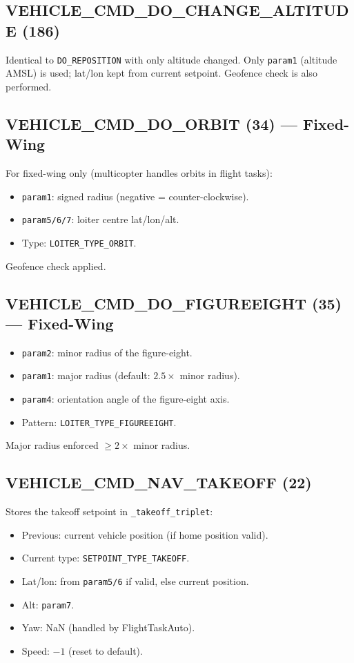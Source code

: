 \documentclass[12pt,a4paper]{article}
\begin{document}
\subsection{VEHICLE\_CMD\_DO\_CHANGE\_ALTITUDE (186)}

Identical to \texttt{DO\_REPOSITION} with only altitude changed.
Only \texttt{param1} (altitude AMSL) is used; lat/lon kept from current setpoint.
Geofence check is also performed.

\subsection{VEHICLE\_CMD\_DO\_ORBIT (34) --- Fixed-Wing}

For fixed-wing only (multicopter handles orbits in flight tasks):
\begin{itemize}
  \item \texttt{param1}: signed radius (negative = counter-clockwise).
  \item \texttt{param5/6/7}: loiter centre lat/lon/alt.
  \item Type: \texttt{LOITER\_TYPE\_ORBIT}.
\end{itemize}
Geofence check applied.

\subsection{VEHICLE\_CMD\_DO\_FIGUREEIGHT (35) --- Fixed-Wing}

\begin{itemize}
  \item \texttt{param2}: minor radius of the figure-eight.
  \item \texttt{param1}: major radius (default: $2.5 \times$ minor radius).
  \item \texttt{param4}: orientation angle of the figure-eight axis.
  \item Pattern: \texttt{LOITER\_TYPE\_FIGUREEIGHT}.
\end{itemize}
Major radius enforced $\geq 2 \times$ minor radius.

\subsection{VEHICLE\_CMD\_NAV\_TAKEOFF (22)}

Stores the takeoff setpoint in \texttt{\_takeoff\_triplet}:
\begin{itemize}
  \item Previous: current vehicle position (if home position valid).
  \item Current type: \texttt{SETPOINT\_TYPE\_TAKEOFF}.
  \item Lat/lon: from \texttt{param5/6} if valid, else current position.
  \item Alt: \texttt{param7}.
  \item Yaw: NaN (handled by FlightTaskAuto).
  \item Speed: $-1$ (reset to default).
\end{itemize}
\end{document}
